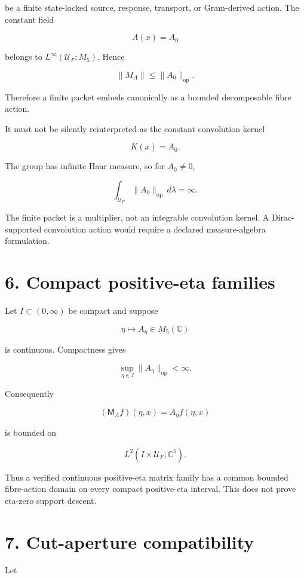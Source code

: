 be a finite state-locked source, response, transport, or Gram-derived action.
The constant field

\[
A(x)=A_0
\]

belongs to \(L^\infty(\mathcal U_F;M_5)\). Hence

\[
\|M_A\|\le\|A_0\|_{\mathrm{op}}.
\]

Therefore a finite packet embeds canonically as a bounded decomposable fibre
action.

It must not be silently reinterpreted as the constant convolution kernel

\[
K(x)=A_0.
\]

The group has infinite Haar measure, so for \(A_0\ne0\),

\[
\int_{\mathcal U_F}\|A_0\|_{\mathrm{op}}\,d\lambda
=\infty.
\]

The finite packet is a multiplier, not an integrable convolution kernel. A
Dirac-supported convolution action would require a declared measure-algebra
formulation.

\hypertarget{compact-positive-eta-families}{%
\section{6. Compact positive-eta families}\label{compact-positive-eta-families}}

Let \(I\subset(0,\infty)\) be compact and suppose

\[
\eta\mapsto A_\eta\in M_5(\mathbb C)
\]

is continuous. Compactness gives

\[
\sup_{\eta\in I}\|A_\eta\|_{\mathrm{op}}<\infty.
\]

Consequently

\[
(\mathsf M_Af)(\eta,x)=A_\eta f(\eta,x)
\]

is bounded on

\[
L^2(I\times\mathcal U_F;\mathbb C^5).
\]

Thus a verified continuous positive-eta matrix family has a common bounded
fibre-action domain on every compact positive-eta interval. This does not prove
eta-zero support descent.

\hypertarget{cut-aperture-compatibility}{%
\section{7. Cut-aperture compatibility}\label{cut-aperture-compatibility}}

Let

